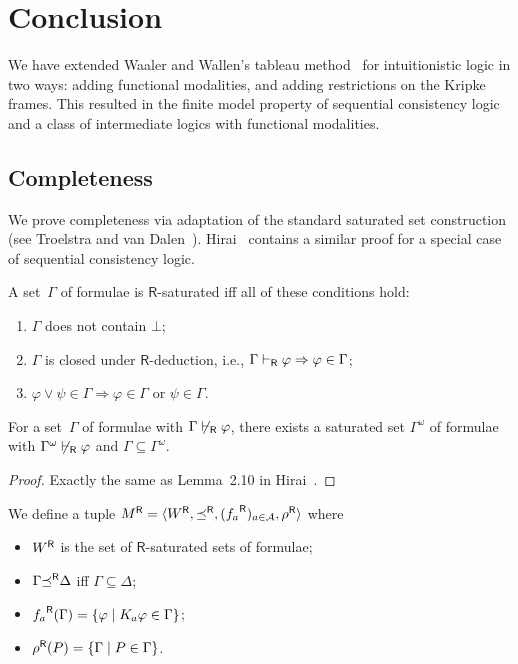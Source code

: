  \section{Conclusion}

 We have extended Waaler and Wallen's tableau method~\cite{waaler1999tableaux} for intuitionistic
 logic in two ways: adding functional modalities, and adding restrictions on the Kripke frames.
 This resulted in the finite model property of sequential consistency
 logic~\cite{hirailpar} and a class of intermediate logics with
 functional modalities.

  \subsection{Completeness}
  We prove completeness via
  adaptation of the standard saturated set construction (see Troelstra
  and van Dalen~\cite[Ch.~2]{troelstra1988constructivism}).
  Hirai~\cite{hirailpar} contains a similar proof for a special case of
  sequential consistency logic.

  \begin{definition}
   A set~$\Gamma$ of formulae is
   $\mathsf R$-saturated iff all of these conditions hold:
   \begin{enumerate}
    \item $\Gamma$ does not contain $\bot$;
    \item $\Gamma$ is closed under $\mathsf R$-deduction, i.e.,
	  $\Gamma\vdash_{\mathsf R}\varphi\Rightarrow\varphi\in\Gamma$;
    \item $\varphi\vee\psi\in\Gamma\Rightarrow\varphi\in\Gamma$ or $\psi\in\Gamma$.
   \end{enumerate}
  \end{definition}

  \begin{proposition}
   \label{hoe:saturation}
   For a set~$\Gamma$ of formulae with $\Gamma\not\vdash_{\mathsf R}\varphi$,
   there exists a
   saturated set $\Gamma^{\omega}$ of formulae with
   $\Gamma^{\omega}\not\vdash_{\mathsf R}\varphi$ and
   $\Gamma\subseteq \Gamma^{\omega}$.
  \end{proposition}
  \begin{proof}
   Exactly the same as Lemma~2.10 in Hirai~\cite{hirailpar}.
  \end{proof}


  \begin{definition}
   We define a tuple
   ${M}^{\mathsf R} = \langle{{W}^{\mathsf R}, {\preceq}^{\mathsf R}, ({f_a}^{\mathsf R})_{a\in \mathcal A}, {\rho}^{\mathsf R}}\rangle$
   where
   \begin{itemize}
    \item ${W}^{\mathsf R}$ is the set of $\mathsf R$-saturated sets of formulae;
    \item $\Gamma{\preceq}^{\mathsf R} \Delta$ iff $\Gamma\subseteq\Delta$;
    \item ${f_a}^{\mathsf R}(\Gamma) = \{\varphi\mid K_a\varphi\in\Gamma\}$;
    \item ${\rho}^{\mathsf R}(P)=\{\Gamma\mid P\in \Gamma\}$.
   \end{itemize}
  \end{definition}

